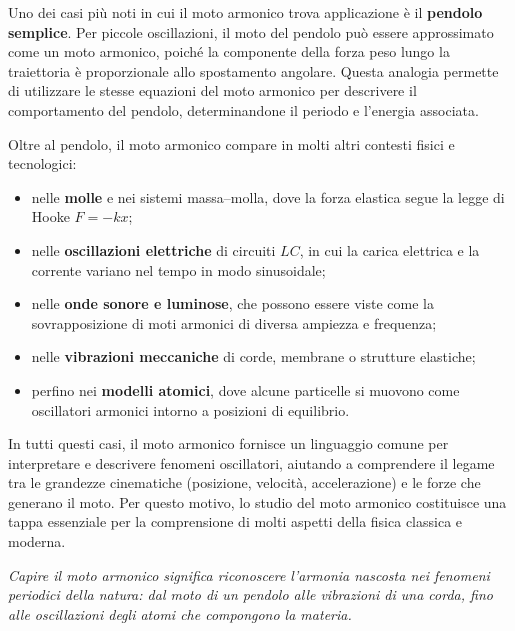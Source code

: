 \documentclass[a4paper,12pt]{article}
\begin{document}
Uno dei casi più noti in cui il moto armonico trova applicazione è il \textbf{pendolo semplice}.  
Per piccole oscillazioni, il moto del pendolo può essere approssimato come un moto armonico, poiché la componente della forza peso lungo la traiettoria è proporzionale allo spostamento angolare.  
Questa analogia permette di utilizzare le stesse equazioni del moto armonico per descrivere il comportamento del pendolo, determinandone il periodo e l’energia associata.

Oltre al pendolo, il moto armonico compare in molti altri contesti fisici e tecnologici:
\begin{itemize}
    \item nelle \textbf{molle} e nei sistemi massa–molla, dove la forza elastica segue la legge di Hooke $F = -kx$;
    \item nelle \textbf{oscillazioni elettriche} di circuiti $LC$, in cui la carica elettrica e la corrente variano nel tempo in modo sinusoidale;
    \item nelle \textbf{onde sonore e luminose}, che possono essere viste come la sovrapposizione di moti armonici di diversa ampiezza e frequenza;
    \item nelle \textbf{vibrazioni meccaniche} di corde, membrane o strutture elastiche;
    \item perfino nei \textbf{modelli atomici}, dove alcune particelle si muovono come oscillatori armonici intorno a posizioni di equilibrio.
\end{itemize}

In tutti questi casi, il moto armonico fornisce un linguaggio comune per interpretare e descrivere fenomeni oscillatori, aiutando a comprendere il legame tra le grandezze cinematiche (posizione, velocità, accelerazione) e le forze che generano il moto.  
Per questo motivo, lo studio del moto armonico costituisce una tappa essenziale per la comprensione di molti aspetti della fisica classica e moderna.

\bigskip
\begin{center}
\textit{Capire il moto armonico significa riconoscere l’armonia nascosta nei fenomeni periodici della natura:  
dal moto di un pendolo alle vibrazioni di una corda, fino alle oscillazioni degli atomi che compongono la materia.}
\end{center}
\end{document}
